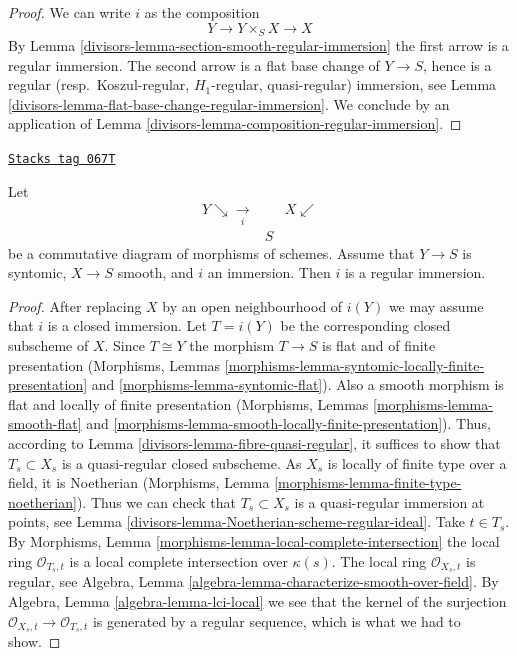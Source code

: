 \begin{proof}

We can write $i$ as the composition
$$
Y \to Y \times_S X \to X
$$
By
Lemma \ref{divisors-lemma-section-smooth-regular-immersion}
the first arrow is a regular immersion.
The second arrow is a flat base change of $Y \to S$, hence is a
regular (resp.\ Koszul-regular, $H_1$-regular, quasi-regular) immersion, see
Lemma \ref{divisors-lemma-flat-base-change-regular-immersion}.
We conclude by an application of
Lemma \ref{divisors-lemma-composition-regular-immersion}.
\end{proof}

\begin{lemma}
\label{divisors-lemma-immersion-lci-into-smooth-regular-immersion}
\href{https://stacks.math.columbia.edu/tag/067T}{\texttt{Stacks tag 067T}}

Let
$$
\begin{array}{ccc}Y \searrow\underset{i}{\longrightarrow} &  & X \swarrow \\  & S & \end{array}
$$
be a commutative diagram of morphisms of schemes.
Assume that $Y \to S$ is syntomic, $X \to S$ smooth, and
$i$ an immersion. Then $i$ is a regular immersion.
\end{lemma}

\begin{proof}

After replacing $X$ by an open neighbourhood of $i(Y)$
we may assume that $i$ is a closed immersion.
Let $T = i(Y)$ be the corresponding closed subscheme of $X$. Since
$T \cong Y$ the morphism $T \to S$ is flat and of finite presentation
(Morphisms, Lemmas
\ref{morphisms-lemma-syntomic-locally-finite-presentation} and
\ref{morphisms-lemma-syntomic-flat}).
Also a smooth morphism is flat and locally of finite presentation
(Morphisms, Lemmas
\ref{morphisms-lemma-smooth-flat} and
\ref{morphisms-lemma-smooth-locally-finite-presentation}).
Thus, according to
Lemma \ref{divisors-lemma-fibre-quasi-regular},
it suffices to show that $T_s \subset X_s$ is a quasi-regular closed
subscheme. As $X_s$ is locally of finite type over a field, it is Noetherian
(Morphisms, Lemma \ref{morphisms-lemma-finite-type-noetherian}).
Thus we can check that $T_s \subset X_s$ is a quasi-regular immersion
at points, see
Lemma \ref{divisors-lemma-Noetherian-scheme-regular-ideal}.
Take $t \in T_s$. By
Morphisms, Lemma \ref{morphisms-lemma-local-complete-intersection}
the local ring $\mathcal{O}_{T_s, t}$ is a local complete intersection
over $\kappa(s)$.
The local ring $\mathcal{O}_{X_s, t}$ is regular, see
Algebra, Lemma \ref{algebra-lemma-characterize-smooth-over-field}.
By
Algebra, Lemma \ref{algebra-lemma-lci-local}
we see that the kernel of the surjection
$\mathcal{O}_{X_s, t} \to \mathcal{O}_{T_s, t}$ is generated by a regular
sequence, which is what we had to show.
\end{proof}

